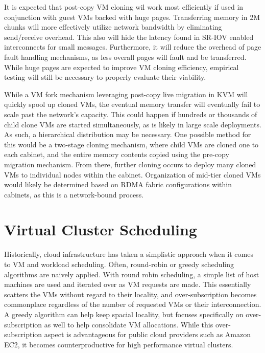It is expected that post-copy VM cloning wil work most efficiently if used in conjunction with guest VMs backed with huge pages. Transferring memory in 2M chunks will more effectively utilize network bandwidth by eliminating send/receive overhead. This also will hide the latency found in SR-IOV enabled interconnects for small messages. Furthermore, it will reduce the overhead of page fault handling mechanisms, as less overall pages will fault and be transferred.  While huge pages are expected to improve VM cloning efficiency, empirical testing will still be necessary to properly evaluate their viability.   

While a VM fork mechanism leveraging post-copy live migration in KVM will quickly spool up cloned VMs, the eventual memory transfer will eventually fail to scale past the network's capacity. This could happen if hundreds or thousands of child clone VMs are started simultaneously, as is likely in large scale deployments. As such, a hierarchical distribution may be necessary. One possible method for this would be a two-stage cloning mechanism, where child VMs are cloned one to each cabinet, and the entire memory contents copied using the pre-copy migration mechanism. From there, further cloning occurs to deploy many cloned VMs to individual nodes within the cabinet. Organization of mid-tier cloned VMs would likely be determined based on RDMA fabric configurations within cabinets, as this is a network-bound process. 





\section{Virtual Cluster Scheduling}
\label{vcsched}


Historically, cloud infrastructure has taken a simplistic approach when it comes to VM and workload scheduling. Often, round-robin or greedy \cite{Younge2011eagc} scheduling algorithms are naively applied. With round robin scheduling, a simple list of host machines are used and iterated over as VM requests are made. This essentially scatters the VMs without regard to their locality, and over-subscription becomes commonplace regardless of the number of requested VMs or their interconnection. A greedy algorithm can help keep spacial locality, but focuses specifically on over-subscription as well to help consolidate VM allocations. While this over-subscription aspect is advantageous for public cloud providers such as Amazon EC2, it becomes counterproductive for high performance virtual clusters.

